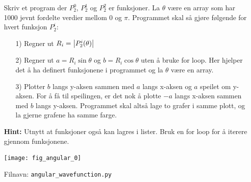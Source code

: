 \documentclass[10pt,a4paper]{article}
\begin{document}
Skriv et program der $P_2^0$, $P_2^1$ og $P_2^2$ er funksjoner. La $\theta$ være en array som har 1000 jevnt fordelte verdier mellom 0 og $\pi$. Programmet skal så gjøre følgende for hvert funksjon $P_2^i$:
\begin{itemize}
	\item[1)] Regner ut $R_i = \abs{P_2^i(\theta)}$
	\item[2)] Regner ut $a = R_i\sin\theta$ og $b = R_i\cos\theta$ uten å bruke for loop. Her hjelper det å ha definert funksjonene i programmet og la $\theta$ være en array.
	\item[3)] Plotter $b$ langs y-aksen sammen med $a$ langs x-aksen og $a$ speilet om y-aksen. For å få til speilingen, er det nok å plotte $-a$ langs x-aksen sammen med $b$ langs y-aksen. Programmet skal altså lage to grafer i samme plott, og la gjerne grafene ha samme farge.
\end{itemize}

\textbf{Hint:} Utnytt at funksjoner også kan lagres i lister. Bruk en for loop for å iterere gjennom funksjonene.

\begin{center}
\texttt{[image: fig\_angular\_0]}
\end{center}

Filnavn: \texttt{angular\_wavefunction.py}
\end{document}
